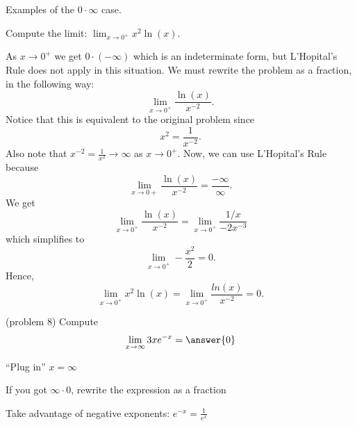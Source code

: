 \documentclass{ximera}
\begin{document}
Examples of the $0\cdot\infty$ case.

\begin{example}[example 8]
Compute the limit: \quad $\displaystyle{\lim_{x \to 0^+}x^2 \ln(x)}$.

As $x\to 0^+$ we get $0 \cdot (-\infty)$ which is an indeterminate form, but L'Hopital's Rule does not apply in this situation.
We must rewrite the problem as a fraction, in the following way:
\[\lim_{x \to 0^+}\frac{\ln(x)}{x^{-2}}.\]
Notice that this is equivalent to the original problem since 
\[x^2 = \frac{1}{x^{-2}}.\]
Also note that $x^{-2} =\frac{1}{x^2} \to \infty$ as $x\to 0^+$.
Now, we can use L'Hopital's Rule because 
\[\lim_{x \to 0+}\frac{\ln(x)}{x^{-2}}= \frac{-\infty}{\infty}.\]
We get
\[\lim_{x \to 0^+}\frac{\ln(x)}{x^{-2}}= \lim_{x\to 0^+} \frac{1/x}{-2x^{-3}}\]
which simplifies to
\[\lim_{x \to 0^+}-\frac{x^2}{2}= 0.\]
Hence, 
\[\lim_{x \to 0^+} x^2 \ln(x)=\lim_{x \to 0^+}\frac{ln(x)}{x^{-2}}= 0.\]
\end{example}


\begin{problem}(problem 8)
  Compute
  \[
  \lim_{x \to \infty} 3xe^{-x} = \answer{0}
  \]
  
    \begin{hint}
      ``Plug in'' $x=\infty$
    \end{hint}
    \begin{hint}
      If you got $\infty \cdot 0$, rewrite the expression as a fraction
    \end{hint}
    \begin{hint}
      Take advantage of negative exponents: $e^{-x} = \frac{1}{e^x}$
    \end{hint}
	
\end{problem}


\begin{center}
\begin{foldable}
\end{foldable}
\end{center}
\end{document}
